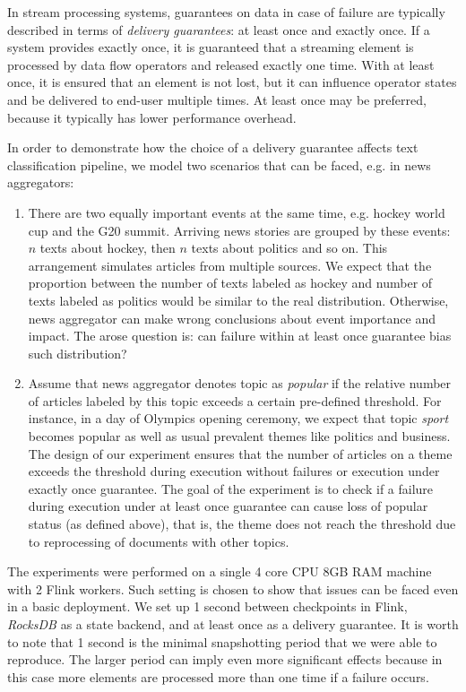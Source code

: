 In stream processing systems, guarantees on data in case of failure are typically described in terms of {\em delivery guarantees}: at least once and exactly once. If a system provides exactly once, it is guaranteed that a streaming element is processed by data flow operators and released exactly one time. With at least once, it is ensured that an element is not lost, but it can influence operator states and be delivered to end-user multiple times. At least once may be preferred, because it typically has lower performance overhead.

In order to demonstrate how the choice of a delivery guarantee affects text classification pipeline, we model two scenarios that can be faced, e.g. in news aggregators:
\begin{enumerate}
    \item There are two equally important events at the same time, e.g. hockey world cup and the G20 summit. Arriving news stories are grouped by these events: $n$ texts about hockey, then $n$ texts about politics and so on. This arrangement simulates articles from multiple sources. We expect that the proportion between the number of texts labeled as hockey and number of texts labeled as politics would be similar to the real distribution. Otherwise, news aggregator can make wrong conclusions about event importance and impact. The arose question is: can failure within at least once guarantee bias such distribution?
    \item Assume that news aggregator denotes topic as {\em popular} if the relative number of articles labeled by this topic exceeds a certain pre-defined threshold. For instance, in a day of Olympics opening ceremony, we expect that topic {\em sport} becomes popular as well as usual prevalent themes like politics and business. The design of our experiment ensures that the number of articles on a theme exceeds the threshold during execution without failures or execution under exactly once guarantee. The goal of the experiment is to check if a failure during execution under at least once guarantee can cause loss of popular status (as defined above), that is, the theme does not reach the threshold due to reprocessing of documents with other topics. 
\end{enumerate}

The experiments were performed on a single 4 core CPU 8GB RAM machine with 2 Flink workers. Such setting is chosen to show that issues can be faced even in a basic deployment. We set up 1 second between checkpoints in Flink, {\em RocksDB} as a state backend, and at least once as a delivery guarantee. It is worth to note that 1 second is the minimal snapshotting period that we were able to reproduce. The larger period can imply even more significant effects because in this case more elements are processed more than one time if a failure occurs.

